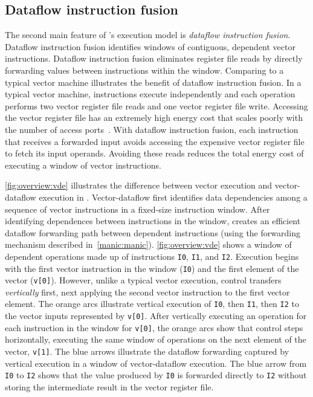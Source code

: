 \subsection{Dataflow instruction fusion}
The second main feature of \manic's execution model is {\em dataflow
instruction fusion}. Dataflow instruction fusion identifies windows of
contiguous, dependent vector instructions. 
%
Dataflow instruction fusion eliminates register file reads by directly
forwarding values between instructions within the window.
%
Comparing to a typical vector machine illustrates the benefit of dataflow
instruction fusion.  In a typical vector machine, instructions execute
independently and each operation performs two vector register file reads
and one vector register file write.
%
Accessing the vector register file has an extremely high energy cost that
scales poorly with the number of access ports~\cite{balfour_elm_thesis,kozyrakis2003overcoming}.  
%
With dataflow instruction fusion, each instruction that receives a forwarded
input avoids accessing the expensive vector register file to fetch its input
operands.  Avoiding these reads reduces the total energy cost of executing a
window of vector instructions.

\autoref{fig:overview:vde} illustrates the difference between vector execution
and vector-dataflow execution in \manic.
%
Vector-dataflow first identifies data dependencies among a sequence of vector
instructions in a fixed-size instruction window.
%
After identifying dependences between instructions in the window, \manic
creates an efficient dataflow forwarding path between dependent instructions
(using the forwarding mechanism described in~\autoref{manic:manic}).
\autoref{fig:overview:vde} shows a window of dependent operations made up of
instructions {\tt I0}, {\tt I1}, and {\tt I2}. 
%
Execution begins with the first vector instruction in the window ({\tt I0}) and the first
element of the vector ({\tt v[0]}).
%
However, unlike a typical vector execution, control transfers {\em vertically}
first, next applying the second vector instruction to the first
vector element. The orange arcs illustrate vertical execution of {\tt I0}, then
{\tt I1}, then {\tt I2} to the vector inputs represented by {\tt v[0]}.
%
After vertically executing an operation for each instruction in the window for
\texttt{v[0]}, the orange arcs show that control steps
horizontally, executing the same window of operations on the next element of
the vector, {\tt v[1]}.  
%
The blue arrows illustrate the dataflow forwarding captured by vertical
execution in a window of vector-dataflow execution.
%
The blue arrow from \texttt{I0} to \texttt{I2} shows that the value produced by
\texttt{I0} is forwarded directly to \texttt{I2} without storing the
intermediate result in the vector register file.



